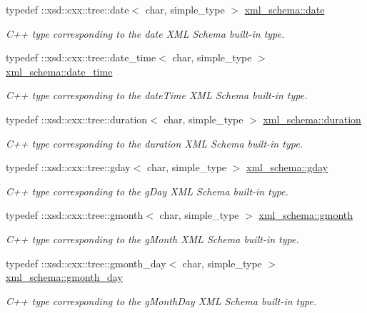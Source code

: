 \begin{DoxyCompactItemize}
typedef \+::xsd\+::cxx\+::tree\+::date$<$ char, simple\+\_\+type $>$ \hyperlink{namespacexml__schema_ad715e8c0fbf8ec80f67de561627f11bf}{xml\+\_\+schema\+::date}
\begin{DoxyCompactList}\small\item\em C++ type corresponding to the date X\+M\+L Schema built-\/in type. \end{DoxyCompactList}\item 
typedef \+::xsd\+::cxx\+::tree\+::date\+\_\+time$<$ char, simple\+\_\+type $>$ \hyperlink{namespacexml__schema_a4e3e937826b835b568d6a97bdaaf0804}{xml\+\_\+schema\+::date\+\_\+time}
\begin{DoxyCompactList}\small\item\em C++ type corresponding to the date\+Time X\+M\+L Schema built-\/in type. \end{DoxyCompactList}\item 
typedef \+::xsd\+::cxx\+::tree\+::duration$<$ char, simple\+\_\+type $>$ \hyperlink{namespacexml__schema_acd79b4620c053b211a2e739daed3b2bf}{xml\+\_\+schema\+::duration}
\begin{DoxyCompactList}\small\item\em C++ type corresponding to the duration X\+M\+L Schema built-\/in type. \end{DoxyCompactList}\item 
typedef \+::xsd\+::cxx\+::tree\+::gday$<$ char, simple\+\_\+type $>$ \hyperlink{namespacexml__schema_a4beba84e7d1a15ea569cad2c7cc2247a}{xml\+\_\+schema\+::gday}
\begin{DoxyCompactList}\small\item\em C++ type corresponding to the g\+Day X\+M\+L Schema built-\/in type. \end{DoxyCompactList}\item 
typedef \+::xsd\+::cxx\+::tree\+::gmonth$<$ char, simple\+\_\+type $>$ \hyperlink{namespacexml__schema_a1ab06e26cf2c2f3ad971f63c143afd7f}{xml\+\_\+schema\+::gmonth}
\begin{DoxyCompactList}\small\item\em C++ type corresponding to the g\+Month X\+M\+L Schema built-\/in type. \end{DoxyCompactList}\item 
typedef \+::xsd\+::cxx\+::tree\+::gmonth\+\_\+day$<$ char, simple\+\_\+type $>$ \hyperlink{namespacexml__schema_aa97adeeeffe50dd9b596b12006c56953}{xml\+\_\+schema\+::gmonth\+\_\+day}
\begin{DoxyCompactList}\small\item\em C++ type corresponding to the g\+Month\+Day X\+M\+L Schema built-\/in type. \end{DoxyCompactList}\item 

\end{DoxyCompactItemize}
